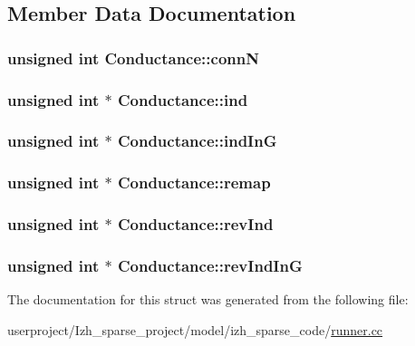 \subsection{Member Data Documentation}
\hypertarget{structConductance_aee4c4f7e96d92c85847b5768c87cf4fa}{
\subsubsection[{conn\+N}]{\setlength{\rightskip}{0pt plus 5cm}unsigned int Conductance\+::conn\+N}}\label{structConductance_aee4c4f7e96d92c85847b5768c87cf4fa}
\hypertarget{structConductance_afa2f0420b680f4d60704450a5ba355e0}{
\subsubsection[{ind}]{\setlength{\rightskip}{0pt plus 5cm}unsigned int $\ast$ Conductance\+::ind}}\label{structConductance_afa2f0420b680f4d60704450a5ba355e0}
\hypertarget{structConductance_aac96f8639db845dc733f83944dafce00}{
\subsubsection[{ind\+In\+G}]{\setlength{\rightskip}{0pt plus 5cm}unsigned int $\ast$ Conductance\+::ind\+In\+G}}\label{structConductance_aac96f8639db845dc733f83944dafce00}
\hypertarget{structConductance_a502fa78df80f5d22933602b799e96a50}{
\subsubsection[{remap}]{\setlength{\rightskip}{0pt plus 5cm}unsigned int $\ast$ Conductance\+::remap}}\label{structConductance_a502fa78df80f5d22933602b799e96a50}
\hypertarget{structConductance_a9ebca206ebf232c47217135a42efe74b}{
\subsubsection[{rev\+Ind}]{\setlength{\rightskip}{0pt plus 5cm}unsigned int $\ast$ Conductance\+::rev\+Ind}}\label{structConductance_a9ebca206ebf232c47217135a42efe74b}
\hypertarget{structConductance_a681be6b793502e01ac9c7c6fbfa69a44}{
\subsubsection[{rev\+Ind\+In\+G}]{\setlength{\rightskip}{0pt plus 5cm}unsigned int $\ast$ Conductance\+::rev\+Ind\+In\+G}}\label{structConductance_a681be6b793502e01ac9c7c6fbfa69a44}


The documentation for this struct was generated from the following file\+:\begin{DoxyCompactItemize}
\item 
userproject/\+Izh\+\_\+sparse\+\_\+project/model/izh\+\_\+sparse\+\_\+code/\hyperlink{Izh__sparse__project_2model_2izh__sparse__code_2runner_8cc}{runner.\+cc}\end{DoxyCompactItemize}
